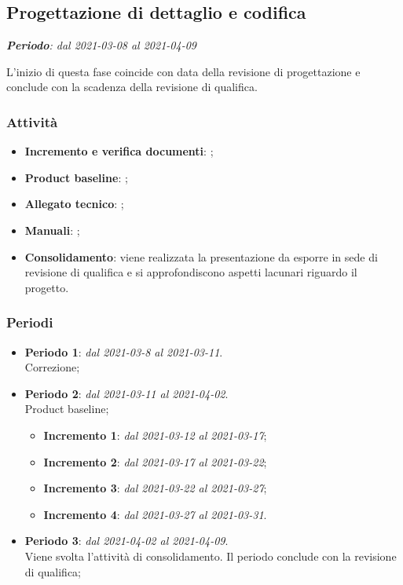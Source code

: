 \subsection{Progettazione di dettaglio e codifica}
\textit{\textbf{Periodo}: dal 2021-03-08 al 2021-04-09}

L'inizio di questa fase coincide con data della revisione di progettazione e conclude con la scadenza della revisione di qualifica.

\subsubsection{Attività}

\begin{itemize}
\item \textbf{Incremento e verifica documenti}: ;
\item \textbf{Product baseline}: ;
\item \textbf{Allegato tecnico}: ;
\item \textbf{Manuali}: ;
\item \textbf{Consolidamento}: viene realizzata la presentazione da esporre in sede di revisione di qualifica e si approfondiscono aspetti lacunari riguardo il progetto.
\end{itemize}

\subsubsection{Periodi}

\begin{itemize}
\item \textbf{Periodo 1}: \textit{dal 2021-03-8 al 2021-03-11}. \\
Correzione;
\item \textbf{Periodo 2}: \textit{dal 2021-03-11 al 2021-04-02}. \\
Product baseline;
\begin{itemize}
\item \textbf{Incremento 1}: \textit{dal 2021-03-12 al 2021-03-17};
\item \textbf{Incremento 2}: \textit{dal 2021-03-17 al 2021-03-22};
\item \textbf{Incremento 3}: \textit{dal 2021-03-22 al 2021-03-27};
\item \textbf{Incremento 4}: \textit{dal 2021-03-27 al 2021-03-31}.
\end{itemize}
\item \textbf{Periodo 3}: \textit{dal 2021-04-02 al 2021-04-09}. \\
Viene svolta l'attività di consolidamento. Il periodo conclude con la revisione di qualifica;
\end{itemize}

